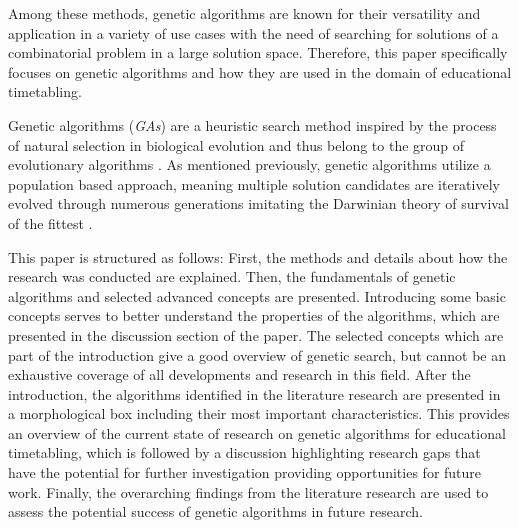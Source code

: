 \documentclass[sigconf]{acmart}
\begin{document}
Among these methods, genetic algorithms are known for their versatility and
application in a variety of use cases with the need of searching for solutions
of a combinatorial problem in a large solution space.
Therefore, this paper specifically focuses on genetic algorithms and how they
are used in the domain of educational timetabling.

Genetic algorithms (\textit{GAs}) are a heuristic search method inspired by
the process of natural selection in biological evolution and thus belong to
the group of evolutionary algorithms \cite{Katoch2021}. As mentioned previously,
genetic algorithms utilize a population based approach, meaning multiple
solution candidates are iteratively evolved through numerous generations
imitating the Darwinian theory of survival of the fittest \cite{Katoch2021}.

This paper is structured as follows:
First, the methods and details about how the research was conducted are
explained.
%
Then, the fundamentals of genetic algorithms and selected advanced concepts
are presented. Introducing some basic concepts serves to better understand the
properties of the algorithms, which are presented in the
discussion section %
of the paper. The selected concepts which are part of the introduction give
a good overview of genetic search, but cannot be an exhaustive coverage of
all developments and research in this field.
%
After the introduction, the algorithms identified in the literature research
are presented in a morphological box including their most important
characteristics.
This provides an overview of the current state of research on genetic
algorithms for educational timetabling, which is followed by a discussion
highlighting research gaps that have the potential for further investigation
providing opportunities for future work.
%
Finally, the overarching findings from the literature research are used to
assess the potential success of genetic algorithms in future research.



\end{document}
